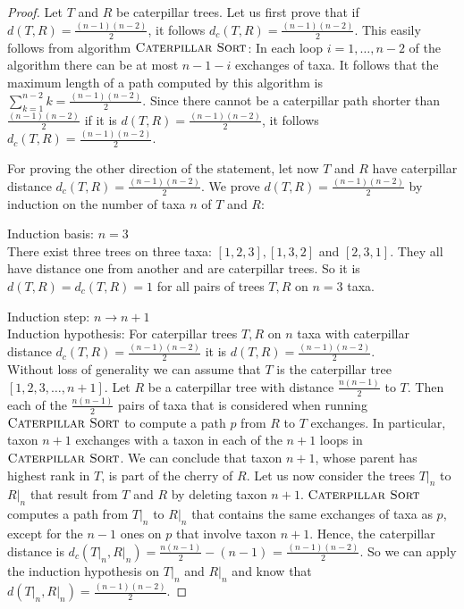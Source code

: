 \documentclass{amsart}
\newcommand{\csort}{\textsc{Caterpillar Sort}}
\begin{document}
\begin{proof}
    Let $T$ and $R$ be caterpillar trees.
    Let us first prove that if $d(T,R) = \frac{(n-1)(n-2)}{2}$, it follows $d_c(T,R) = \frac{(n-1)(n-2)}{2}$.
    This easily follows from algorithm $\csort$:
    In each loop $i=1, \ldots, n-2$ of the algorithm there can be at most $n-1-i$ exchanges of taxa.
    It follows that the maximum length of a path computed by this algorithm is $\sum\limits_{k=1}^{n-2} k = \frac{(n-1)(n-2)}{2}$.
    Since there cannot be a caterpillar path shorter than $\frac{(n-1)(n-2)}{2}$ if it is $d(T,R) = \frac{(n-1)(n-2)}{2}$, it follows $d_c(T,R) =  \frac{(n-1)(n-2)}{2}$.

    For proving the other direction of the statement, let now $T$ and $R$ have caterpillar distance $d_c(T,R) =  \frac{(n-1)(n-2)}{2}$.
    We prove $d(T,R) = \frac{(n-1)(n-2)}{2}$ by induction on the number of taxa $n$ of $T$ and $R$:

    Induction basis: $n=3$\\
    There exist three trees on three taxa: $[1,2,3], [1,3,2]$ and $[2,3,1]$.
    They all have distance one from another and are caterpillar trees.
    So it is $d(T,R) = d_c(T,R) = 1$ for all pairs of trees $T,R$ on $n=3$ taxa.

    Induction step: $n \to n+1$\\
    Induction hypothesis: For caterpillar trees $T, R$ on $n$ taxa with caterpillar distance $d_c(T,R) = \frac{(n-1)(n-2)}{2}$ it is $d(T,R) = \frac{(n-1)(n-2)}{2}$.\\
    Without loss of generality we can assume that $T$ is the caterpillar tree $[1,2,3,\ldots,n+1]$.
    Let $R$ be a caterpillar tree with distance $\frac{n(n-1)}{2}$ to $T$.
    Then each of the $\frac{n(n-1)}{2}$ pairs of taxa that is considered when running $\csort$ to compute a path $p$ from $R$ to $T$ exchanges.
    In particular, taxon $n+1$ exchanges with a taxon in each of the $n+1$ loops in $\csort$.
    We can conclude that taxon $n+1$, whose parent has highest rank in $T$, is part of the cherry of $R$.
    Let us now consider the trees $T{\big|}_n$ to $R{\big|}_n$ that result from $T$ and $R$ by deleting taxon $n+1$.
    $\csort$ computes a path from $T{\big|}_n$ to $R{\big|}_n$ that contains the same exchanges of taxa as $p$, except for the $n-1$ ones on $p$ that involve taxon $n+1$.
    Hence, the caterpillar distance is $d_c(T{\big|}_n, R{\big|}_n) = \frac{n(n-1)}{2} - (n-1)$ = $\frac{(n-1)(n-2)}{2}$.
    So we can apply the induction hypothesis on $T{\big|}_n$ and $R{\big|}_n$ and know that $d(T{\big|}_n,R{\big|}_n) = \frac{(n-1)(n-2)}{2}$.


\end{proof}
\end{document}
